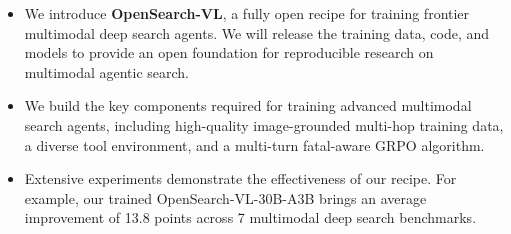 \begin{itemize}[leftmargin=*, noitemsep]
    \item We introduce \textbf{OpenSearch-VL}, a fully open recipe for training frontier multimodal deep search agents. 
    We will release the training data, code, and models to provide an open foundation for reproducible research on multimodal agentic search.
    \item We build the key components required for training advanced multimodal search agents, including high-quality image-grounded multi-hop training data, a diverse tool environment, and a multi-turn fatal-aware GRPO algorithm. 
    \item Extensive experiments demonstrate the effectiveness of our recipe. For example, our trained OpenSearch-VL-30B-A3B brings an average improvement of 13.8 points across 7 multimodal deep search benchmarks.
\end{itemize}

\vspace{-0.1in}